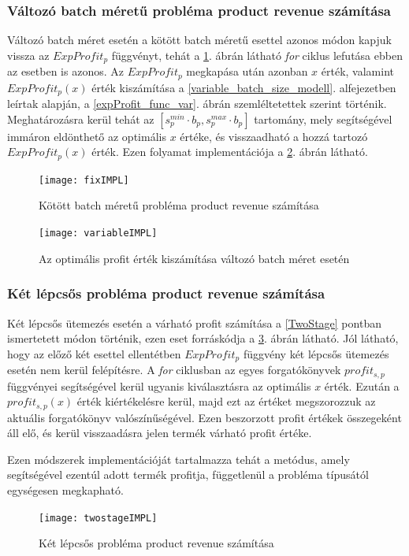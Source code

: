 \subsubsection{Változó batch méretű probléma product revenue számítása}
Változó batch méret esetén a kötött batch méretű esettel azonos módon kapjuk vissza az $ExpProfit_p$ függvényt, tehát a \ref{fixIMPL}. ábrán látható \textit{for} ciklus lefutása ebben az esetben is azonos.
Az $ExpProfit_p$ megkapása után azonban $x$ érték, valamint $ExpProfit_p(x)$ érték kiszámítása a \ref{variable_batch_size_modell}. alfejezetben leírtak alapján, a \ref{expProfit_func_var}. ábrán szemléltetettek szerint történik.
Meghatározásra kerül tehát az  $[s_p^{min} \cdot b_p , s_p^{max} \cdot b_p]$ tartomány, mely segítségével immáron eldönthető az optimális $x$ értéke, és visszaadható a hozzá tartozó  $ExpProfit_p(x)$ érték. 
Ezen folyamat implementációja a \ref{variableIMPL}. ábrán látható.
\begin{figure}
\begin{center}
\texttt{[image: fixIMPL]}
\caption{Kötött batch méretű probléma product revenue számítása}
\label{fixIMPL}
\end{center}
\end{figure} 
\begin{figure}[H]
\begin{center}
\texttt{[image: variableIMPL]}
\caption{Az optimális profit érték kiszámítása változó batch méret esetén}
\label{variableIMPL}
\end{center}
\end{figure} 
\subsubsection{Két lépcsős probléma product revenue számítása}
Két lépcsős ütemezés esetén a várható profit számítása a \ref{TwoStage} pontban ismertetett módon történik, ezen eset forráskódja a \ref{twostageIMPL}. ábrán látható.
Jól látható, hogy az előző két esettel ellentétben  $ExpProfit_p$ függvény két lépcsős ütemezés esetén nem kerül felépítésre.
A \textit{for} ciklusban az egyes forgatókönyvek $profit_{s,p}$ függvényei segítségével kerül ugyanis kiválasztásra az optimális $x$ érték.
Ezután a $profit_{s,p}(x)$ érték kiértékelésre kerül, majd ezt az értéket megszorozzuk az aktuális forgatókönyv valószínűségével.
Ezen beszorzott profit értékek összegeként áll elő, és kerül visszaadásra jelen termék várható profit értéke.

Ezen módszerek implementációját tartalmazza tehát a  metódus, amely segítségével ezentúl adott termék profitja, függetlenül a probléma típusától egységesen megkapható.
\begin{figure}[H]
\begin{center}
\texttt{[image: twostageIMPL]}
\caption{Két lépcsős probléma product revenue számítása}
\label{twostageIMPL}
\end{center}
\end{figure} 
